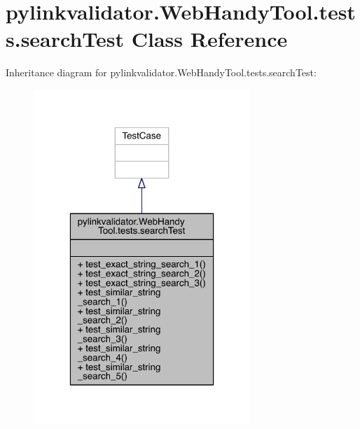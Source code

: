 \hypertarget{classpylinkvalidator_1_1_web_handy_tool_1_1tests_1_1search_test}{}\section{pylinkvalidator.\+Web\+Handy\+Tool.\+tests.\+search\+Test Class Reference}
\label{classpylinkvalidator_1_1_web_handy_tool_1_1tests_1_1search_test}


Inheritance diagram for pylinkvalidator.\+Web\+Handy\+Tool.\+tests.\+search\+Test\+:
\nopagebreak
\begin{figure}[H]
\begin{center}
\leavevmode
\includegraphics[width=232pt]{classpylinkvalidator_1_1_web_handy_tool_1_1tests_1_1search_test__inherit__graph}
\end{center}
\end{figure}


